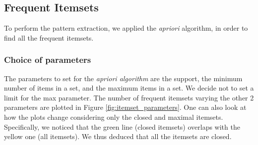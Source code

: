 \documentclass[a4paper,11pt,dvipsnames]{article}
\begin{document}
\subsection{Frequent Itemsets}
To perform the pattern extraction, we applied the \textit{apriori} algorithm, in order to find all the frequent itemsets.

\subsubsection{Choice of parameters}
The parameters to set for the \textit{apriori algorithm} are the support, the minimum number of items in a set, and the maximum items in a set. We decide not to set a limit for the max parameter. The number of frequent itemsets varying the other 2 parameters are plotted in Figure \ref{fig:itemset_parameters}. One can also look at how the plots change considering only the closed and maximal itemsets. Specifically, we noticed that the green line (closed itemsets) overlaps with the yellow one (all itemsets). We thus deduced that all the itemsets are closed.
\end{document}
